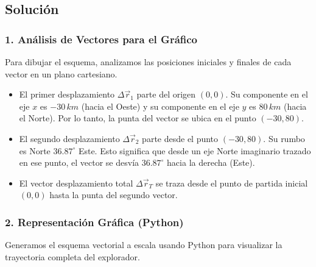 \documentclass[12pt, a4paper]{article}
\begin{document}
\subsection*{Solución}

\subsubsection*{1. Análisis de Vectores para el Gráfico}
Para dibujar el esquema, analizamos las posiciones iniciales y finales de cada vector en un plano cartesiano.
\begin{itemize}
    \item El primer desplazamiento $\Delta\vec{r}_1$ parte del origen $(0,0)$. Su componente en el eje $x$ es $-30 \, \si{km}$ (hacia el Oeste) y su componente en el eje $y$ es $80 \, \si{km}$ (hacia el Norte). Por lo tanto, la punta del vector se ubica en el punto $(-30, 80)$.
    \item El segundo desplazamiento $\Delta\vec{r}_2$ parte desde el punto $(-30, 80)$. Su rumbo es Norte $36.87^\circ$ Este. Esto significa que desde un eje Norte imaginario trazado en ese punto, el vector se desvía $36.87^\circ$ hacia la derecha (Este).
    \item El vector desplazamiento total $\Delta\vec{r}_T$ se traza desde el punto de partida inicial $(0,0)$ hasta la punta del segundo vector.
\end{itemize}

\subsubsection*{2. Representación Gráfica (Python)}
Generamos el esquema vectorial a escala usando Python para visualizar la trayectoria completa del explorador.
\end{document}

